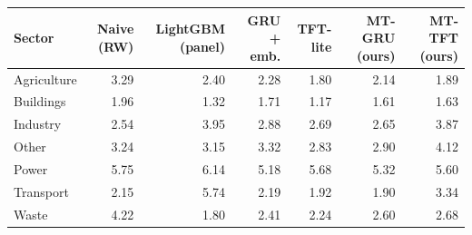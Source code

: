 \begin{tabular}{lrrrrrr}
\toprule
Sector & Naive (RW) & LightGBM (panel) & GRU + emb. & TFT-lite & MT-GRU (ours) & MT-TFT (ours) \\
\midrule
Agriculture & 3.29 & 2.40 & 2.28 & 1.80 & 2.14 & 1.89 \\
Buildings & 1.96 & 1.32 & 1.71 & 1.17 & 1.61 & 1.63 \\
Industry & 2.54 & 3.95 & 2.88 & 2.69 & 2.65 & 3.87 \\
Other & 3.24 & 3.15 & 3.32 & 2.83 & 2.90 & 4.12 \\
Power & 5.75 & 6.14 & 5.18 & 5.68 & 5.32 & 5.60 \\
Transport & 2.15 & 5.74 & 2.19 & 1.92 & 1.90 & 3.34 \\
Waste & 4.22 & 1.80 & 2.41 & 2.24 & 2.60 & 2.68 \\
\bottomrule
\end{tabular}
